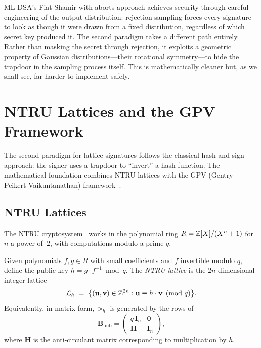 ML-DSA's Fiat-Shamir-with-aborts approach achieves security through careful engineering of the output distribution: rejection sampling forces every signature to look as though it were drawn from a fixed distribution, regardless of which secret key produced it.  The second paradigm takes a different path entirely.  Rather than masking the secret through rejection, it exploits a geometric property of Gaussian distributions---their rotational symmetry---to hide the trapdoor in the sampling process itself.  This is mathematically cleaner but, as we shall see, far harder to implement safely.


\section{NTRU Lattices and the GPV Framework}
\label{sec:ntru-gpv}

The second paradigm for lattice signatures follows the classical hash-and-sign approach: the signer uses a trapdoor to ``invert'' a hash function.  The mathematical foundation combines NTRU lattices with the GPV (Gentry-Peikert-Vaikuntanathan) framework~\cite{GPV2008}.

\subsection{NTRU Lattices}
\label{subsec:ntru-lattices}

The NTRU cryptosystem~\cite{NTRU1998} works in the polynomial ring $R = \mathbb{Z}[X]/(X^n + 1)$ for $n$ a power of~$2$, with computations modulo a prime $q$.

\begin{definition}
\label{def:ntru-lattice}
Given polynomials $f, g \in R$ with small coefficients and $f$ invertible modulo $q$, define the public key $h = g \cdot f^{-1} \bmod q$.  The \emph{NTRU lattice} is the $2n$-dimensional integer lattice
\begin{equation}
\label{eq:ntru-lattice}
\mathcal{L}_h \;=\; \bigl\{(\mathbf{u}, \mathbf{v}) \in \mathbb{Z}^{2n} : \mathbf{u} \equiv h \cdot \mathbf{v} \pmod{q}\bigr\}.
\end{equation}
Equivalently, in matrix form, $\lat_h$ is generated by the rows of
\begin{equation}
\label{eq:ntru-basis}
\mathbf{B}_{\mathrm{pub}} = \begin{pmatrix} q\,\mathbf{I}_n & \mathbf{0} \\ \mathbf{H} & \mathbf{I}_n \end{pmatrix},
\end{equation}
where $\mathbf{H}$ is the anti-circulant matrix corresponding to multiplication by $h$.
\end{definition}

